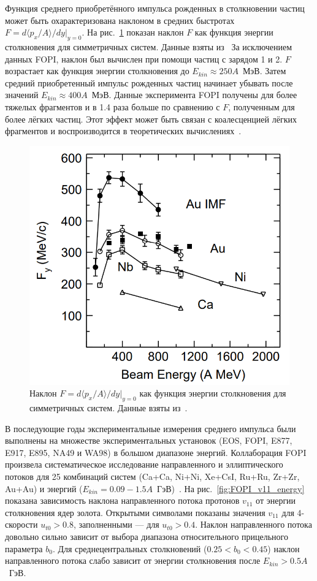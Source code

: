 Функция среднего приобретённого импульса рожденных в столкновении частиц может быть охарактеризована наклоном в средних быстротах $F=d\langle p_x /A \rangle / dy|_{y=0}$.
На рис.~\ref{fig:F_pball} показан наклон $F$ как функция энергии столкновения для симметричных систем. 
Данные взяты из~\cite{Gutbrod:1989wd, EOS:1994kku, EOS:1996kon, FOPI:2011aa}
За исключением данных FOPI, наклон был вычислен при помощи частиц с зарядом 1 и 2.
$F$ возрастает как функция энергии столкновения до $E_{kin} \approx 250A$~МэВ.
Затем средний приобретенный импульс рожденных частиц начинает убывать после значений $E_{kin} \approx 400A$~МэВ.
Данные эксперимента FOPI получены для более тяжелых фрагментов и в 1.4 раза больше по сравнению с $F$, полученным для более лёгких частиц. 
Этот эффект может быть связан с коалесценцией лёгких фрагментов и воспроизводится в теоретических вычислениях~\cite{EOS:1994jzn}.
%
\begin{figure}
    \centering
    \includegraphics[width=0.55\linewidth]{images/F_energy.png}
    \caption{Наклон $F=d\langle p_x /A \rangle / dy|_{y=0}$ как функция энергии столкновения для симметричных систем. Данные взяты из~\cite{Gutbrod:1989wd, EOS:1994kku, EOS:1996kon, FOPI:2011aa}.}
    \label{fig:F_pball}
\end{figure}

В последующие годы экспериментальные измерения среднего импульса были выполнены на множестве экспериментальных установок (EOS, FOPI, E877, E917, E895, NA49 и WA98) в большом диапазоне энергий.
Коллаборация FOPI произвела систематическое исследование направленного и эллиптического потоков для 25 комбинаций систем (Ca+Ca, Ni+Ni, Xe+CsI, Ru+Ru, Zr+Zr, Au+Au) и энергий ($E_{kin}=0.09-1.5A$~ГэВ)~\cite{FOPI:2011aa}. 
На рис.~\ref{fig:FOPI_v11_energy} показана зависимость наклона направленного потока протонов $v_{11}$ от энергии столкновения ядер золота. 
Открытыми символами показаны значения $v_{11}$ для 4-скорости $u_{t0}>0.8$, заполненными --- для $u_{t0}>0.4$.
Наклон направленного потока довольно сильно зависит от выбора диапазона относительного прицельного параметра $b_0$.
Для среднецентральных столкновений ($0.25<b_0<0.45$) наклон направленного потока слабо зависит от энергии столкновения после $E_{kin}>0.5A$~ГэВ.

